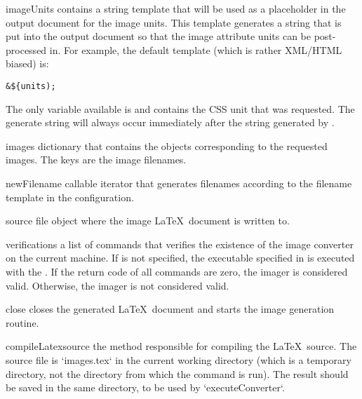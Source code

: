 \begin{memberdesc}[Imager]{imageUnits}
contains a string template that will be used as a placeholder in the
output document for the image units.  This template generates a string
that is put into the output document so that the image attribute units
can be post-processed in.  For example, the default template (which is
rather XML/HTML biased) is:
\begin{verbatim}
&${units);
\end{verbatim}
The only variable available is  and contains the CSS unit
that was requested.  The generate string will always occur immediately
after the string generated by .
\end{memberdesc}

\begin{memberdesc}[Imager]{images}
dictionary that contains the  objects corresponding to
the requested images.  The keys are the image filenames.
\end{memberdesc}

\begin{memberdesc}[Imager]{newFilename}
callable iterator that generates filenames according to the filename template
in the configuration.
\end{memberdesc}

\begin{memberdesc}[Imager]{source}
file object where the image \LaTeX\ document is written to.
\end{memberdesc}

\begin{memberdesc}[Imager]{verifications}
a list of commands that verifies the existence of the image converter on the
current machine. If  is not specified, the executable
specified in  is executed with the .  If
the return code of all commands are zero, the imager is considered valid.
Otherwise, the imager is not considered valid.
\end{memberdesc}


\begin{methoddesc}[Imager]{close}{}
closes the generated \LaTeX\ document and starts the image generation routine.
\end{methoddesc}

\begin{methoddesc}[Imager]{compileLatex}{source}
the method responsible for compiling the \LaTeX\ source. The source file is
`images.tex` in the current working directory (which is a temporary directory,
not the directory from which the command is run). The result should be saved in
the same directory, to be used by `executeConverter`.


\end{methoddesc}

